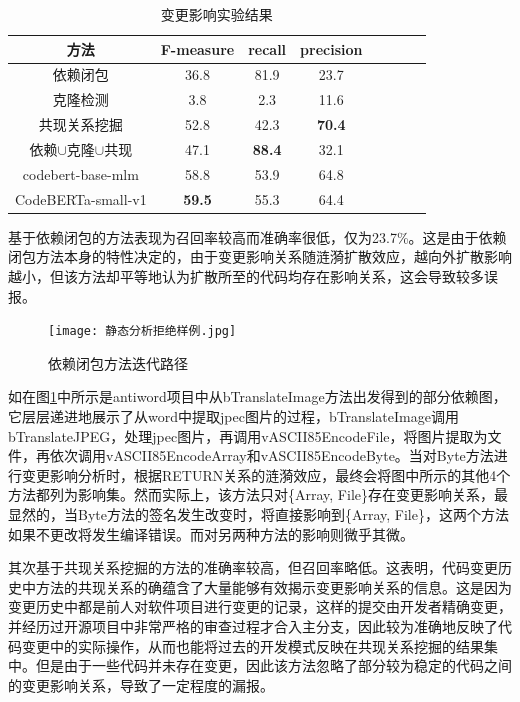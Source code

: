 \begin{table}[htbp]
\caption{变更影响实验结果}
\label{1_变更影响实验结果}
\vspace{0.5em}\centering\wuhao
\begin{tabular}{cccccccc}
\toprule
方法 & F-measure & recall & precision  \\
\midrule
依赖闭包 & 36.8&81.9&23.7  \\
克隆检测 & 3.8&2.3&11.6 \\
共现关系挖掘 & 52.8&42.3&\textbf{70.4} \\
依赖$\cup$克隆$\cup$共现 & 47.1&\textbf{88.4}&32.1 \\
codebert-base-mlm & 58.8&53.9&64.8 \\
CodeBERTa-small-v1 & \textbf{59.5} & 55.3 & 64.4 \\
\bottomrule
\end{tabular}
\end{table}

基于依赖闭包的方法表现为召回率较高而准确率很低，仅为23.7\%。这是由于依赖闭包方法本身的特性决定的，由于变更影响关系随涟漪扩散效应，越向外扩散影响越小，但该方法却平等地认为扩散所至的代码均存在影响关系，这会导致较多误报。

\begin{figure}[htbp]
\centering
\texttt{[image: 静态分析拒绝样例.jpg]}
\caption{依赖闭包方法迭代路径}
\label{1_依赖闭包方法迭代路径}
\end{figure}

如在图\ref{1_依赖闭包方法迭代路径}中所示是antiword项目中从bTranslateImage方法出发得到的部分依赖图，它层层递进地展示了从word中提取jpec图片的过程，bTranslateImage调用bTranslateJPEG，处理jpec图片，再调用vASCII85EncodeFile，将图片提取为文件，再依次调用vASCII85EncodeArray和vASCII85EncodeByte。当对Byte方法进行变更影响分析时，根据RETURN关系的涟漪效应，最终会将图中所示的其他4个方法都列为影响集。然而实际上，该方法只对\{Array, File\}存在变更影响关系，最显然的，当Byte方法的签名发生改变时，将直接影响到\{Array, File\}，这两个方法如果不更改将发生编译错误。而对另两种方法的影响则微乎其微。

其次基于共现关系挖掘的方法的准确率较高，但召回率略低。这表明，代码变更历史中方法的共现关系的确蕴含了大量能够有效揭示变更影响关系的信息。这是因为变更历史中都是前人对软件项目进行变更的记录，这样的提交由开发者精确变更，并经历过开源项目中非常严格的审查过程才合入主分支，因此较为准确地反映了代码变更中的实际操作，从而也能将过去的开发模式反映在共现关系挖掘的结果集中。但是由于一些代码并未存在变更，因此该方法忽略了部分较为稳定的代码之间的变更影响关系，导致了一定程度的漏报。

